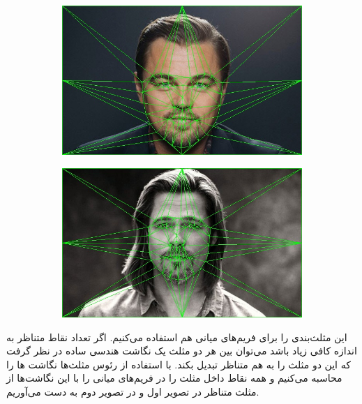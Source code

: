 \documentclass[a4paper,12pt]{article}
\begin{document}
\begin{figure}[H]
	\centering
	\begin{subfigure}{0.5\textwidth}
		\centering
		\includegraphics[width=.9\textwidth]{4.jpg}
	\end{subfigure}%
	\begin{subfigure}{0.5\textwidth}
		\centering
		\includegraphics[width=.9\textwidth]{5.jpg}
	\end{subfigure}%
\end{figure}
این مثلث‌بندی را برای فریم‌های میانی هم استفاده می‌کنیم. اگر تعداد نقاط متناظر به اندازه کافی زیاد باشد می‌توان بین هر دو مثلث یک نگاشت هندسی ساده در نظر گرفت که این دو مثلث را به هم متناظر تبدیل بکند. با استفاده از رئوس مثلث‌ها نگاشت ها را محاسبه می‌کنیم و همه نقاط داخل مثلث را در فریم‌های میانی را با این نگاشت‌ها از مثلث متناظر در تصویر اول و در تصویر دوم به دست می‌آوریم.
\end{document}
